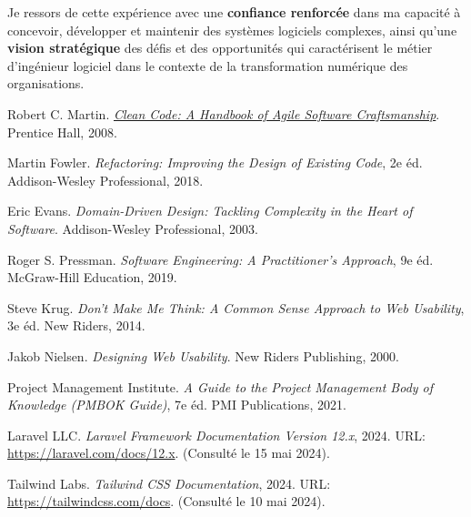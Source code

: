 \documentclass[12pt,a4paper]{report}
\begin{document}
Je ressors de cette expérience avec une \textbf{confiance renforcée} dans ma capacité à concevoir, développer et maintenir des systèmes logiciels complexes, ainsi qu'une \textbf{vision stratégique} des défis et des opportunités qui caractérisent le métier d'ingénieur logiciel dans le contexte de la transformation numérique des organisations.











\begin{thebibliography}{99} %

Robert C. Martin.
\newblock \href{https://www.pearson.com/en-us/subject-catalog/p/clean-code-a-handbook-of-agile-software-craftsmanship/P200000003348/9780132350884}{\textit{Clean Code: A Handbook of Agile Software Craftsmanship}}.
\newblock Prentice Hall, 2008.

Martin Fowler.
\newblock \textit{Refactoring: Improving the Design of Existing Code}, 2e éd.
\newblock Addison-Wesley Professional, 2018.

Eric Evans.
\newblock \textit{Domain-Driven Design: Tackling Complexity in the Heart of Software}.
\newblock Addison-Wesley Professional, 2003.

Roger S. Pressman.
\newblock \textit{Software Engineering: A Practitioner's Approach}, 9e éd.
\newblock McGraw-Hill Education, 2019.

Steve Krug.
\newblock \textit{Don't Make Me Think: A Common Sense Approach to Web Usability}, 3e éd.
\newblock New Riders, 2014.

Jakob Nielsen.
\newblock \textit{Designing Web Usability}.
\newblock New Riders Publishing, 2000.

Project Management Institute.
\newblock \textit{A Guide to the Project Management Body of Knowledge (PMBOK Guide)}, 7e éd.
\newblock PMI Publications, 2021.

Laravel LLC.
\newblock \textit{Laravel Framework Documentation Version 12.x}, 2024.
\newblock URL: \url{https://laravel.com/docs/12.x}.
\newblock (Consulté le 15 mai 2024).

Tailwind Labs.
\newblock \textit{Tailwind CSS Documentation}, 2024.
\newblock URL: \url{https://tailwindcss.com/docs}.
\newblock (Consulté le 10 mai 2024).


\end{thebibliography}
\end{document}
